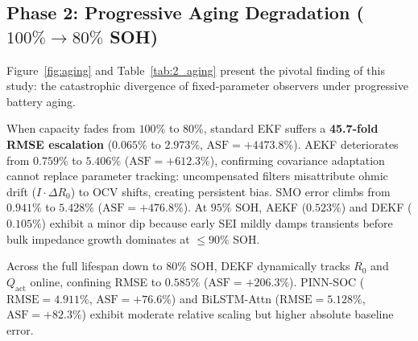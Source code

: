 \documentclass[balance,nocopyright,upint,varvw,hyphenate,barcolor=NavyBlue,nolists]{asmejour}
\begin{document}
\subsection[Phase 2: Progressive Aging Degradation]{Phase 2: Progressive Aging Degradation ($100\% \rightarrow 80\%$ SOH)}
Figure~\ref{fig:aging} and Table~\ref{tab:2_aging} present the pivotal finding of this study: the catastrophic divergence of fixed-parameter observers under progressive battery aging.

When capacity fades from $100\%$ to $80\%$, standard EKF suffers a \textbf{45.7-fold RMSE escalation} ($0.065\%$ to $2.973\%$, $\text{ASF} = +4473.8\%$). AEKF deteriorates from $0.759\%$ to $5.406\%$ ($\text{ASF} = +612.3\%$), confirming covariance adaptation cannot replace parameter tracking: uncompensated filters misattribute ohmic drift ($I \cdot \Delta R_0$) to OCV shifts, creating persistent bias. SMO error climbs from $0.941\%$ to $5.428\%$ ($\text{ASF} = +476.8\%$). At $95\%$ SOH, AEKF ($0.523\%$) and DEKF ($0.105\%$) exhibit a minor dip because early SEI mildly damps transients before bulk impedance growth dominates at $\le 90\%$ SOH.

Across the full lifespan down to $80\%$ SOH, DEKF dynamically tracks $R_0$ and $Q_{\text{act}}$ online, confining RMSE to $0.585\%$ ($\text{ASF} = +206.3\%$). PINN-SOC ($\text{RMSE} = 4.911\%$, $\text{ASF} = +76.6\%$) and BiLSTM-Attn ($\text{RMSE} = 5.128\%$, $\text{ASF} = +82.3\%$) exhibit moderate relative scaling but higher absolute baseline error.

\begin{table}[t]
\caption{Degradation benchmark across progressive SOH stages [Tier~2 Calibrated Co-Simulation, anchored to Tier~1 RPT checkpoints at $100\%, 90\%, 80\%$ SOH; $95\%, 85\%$ SOH evaluated via Eq.~\eqref{eqn:aging_q}--\eqref{eqn:aging_r1}]\label{tab:2_aging}}
%
\end{table}
\end{document}

